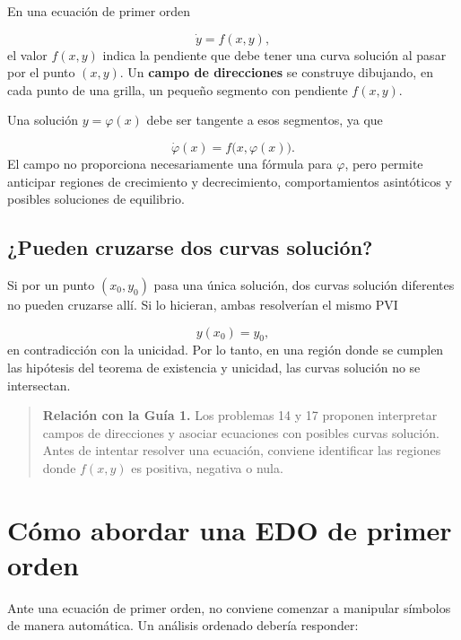 \documentclass[12pt,a4paper]{article}
\begin{document}
	En una ecuación de primer orden

	\[
	\dot{y}=f(x,y),
	\]
el valor \(f(x,y)\) indica la pendiente que debe tener una curva solución al pasar por el punto \((x,y)\). Un \textbf{campo de direcciones} se construye dibujando, en cada punto de una grilla, un pequeño segmento con pendiente \(f(x,y)\).

	Una solución \(y=\varphi(x)\) debe ser tangente a esos segmentos, ya que

	\[
	\dot{\varphi}(x)=f\bigl(x,\varphi(x)\bigr).
	\]
El campo no proporciona necesariamente una fórmula para \(\varphi\), pero permite anticipar regiones de crecimiento y decrecimiento, comportamientos asintóticos y posibles soluciones de equilibrio.

	\subsection{¿Pueden cruzarse dos curvas solución?}

	Si por un punto \((x_0,y_0)\) pasa una única solución, dos curvas solución diferentes no pueden cruzarse allí. Si lo hicieran, ambas resolverían el mismo PVI

	\[
	y(x_0)=y_0,
	\]
en contradicción con la unicidad. Por lo tanto, en una región donde se cumplen las hipótesis del teorema de existencia y unicidad, las curvas solución no se intersectan.

	\begin{quote}
		\textbf{Relación con la Guía 1.} Los problemas 14 y 17 proponen interpretar campos de direcciones y asociar ecuaciones con posibles curvas solución. Antes de intentar resolver una ecuación, conviene identificar las regiones donde \(f(x,y)\) es positiva, negativa o nula.
	\end{quote}

	\clearpage
	\section{Cómo abordar una EDO de primer orden}

	Ante una ecuación de primer orden, no conviene comenzar a manipular símbolos de manera automática. Un análisis ordenado debería responder:
\end{document}
